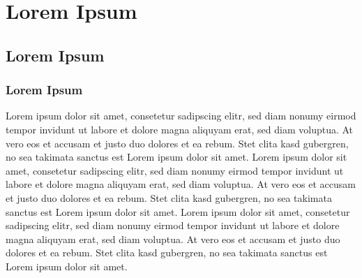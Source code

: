 \documentclass[11pt,openright,twoside]{report}
\newcommand{\LIMPAC}{
\newpage
\mbox{}
\thispagestyle{plain}
}
\numberwithin{equation}{chapter}
\begin{document}

\listoffigures
\LIMPAC


%


\setcounter{page}{1}

\chapter{Lorem Ipsum}
\LIMPAC
\section{Lorem Ipsum}
\subsection{Lorem Ipsum}
Lorem ipsum dolor sit amet, consetetur sadipscing elitr, sed diam nonumy eirmod tempor invidunt ut labore et dolore magna aliquyam erat, sed diam voluptua. At vero eos et accusam et justo duo dolores et ea rebum. Stet clita kasd gubergren, no sea takimata sanctus est Lorem ipsum dolor sit amet. Lorem ipsum dolor sit amet, consetetur sadipscing elitr,  sed diam nonumy eirmod tempor invidunt ut labore et dolore magna aliquyam erat, sed diam voluptua. At vero eos et accusam et justo duo dolores et ea rebum. Stet clita kasd gubergren, no sea takimata sanctus est Lorem ipsum dolor sit amet. Lorem ipsum dolor sit amet, consetetur sadipscing elitr,  sed diam nonumy eirmod tempor invidunt ut labore et dolore magna aliquyam erat, sed diam voluptua. At vero eos et accusam et justo duo dolores et ea rebum. Stet clita kasd gubergren, no sea takimata sanctus est Lorem ipsum dolor sit amet.

%
%
%

%

%

\printglossary
\end{document}
